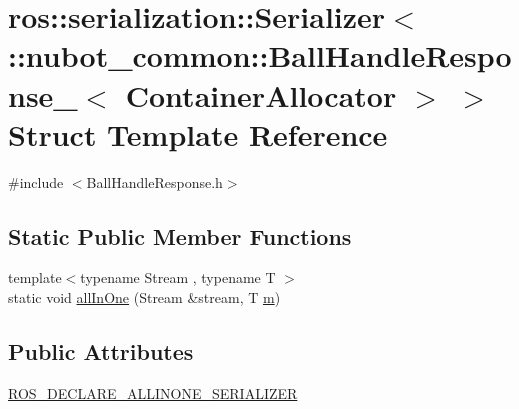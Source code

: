 \hypertarget{structros_1_1serialization_1_1Serializer_3_01_1_1nubot__common_1_1BallHandleResponse___3_01ContainerAllocator_01_4_01_4}{\section{ros\-:\-:serialization\-:\-:Serializer$<$ \-:\-:nubot\-\_\-common\-:\-:Ball\-Handle\-Response\-\_\-$<$ Container\-Allocator $>$ $>$ Struct Template Reference}
\label{structros_1_1serialization_1_1Serializer_3_01_1_1nubot__common_1_1BallHandleResponse___3_01ContainerAllocator_01_4_01_4}
}


{\ttfamily \#include $<$Ball\-Handle\-Response.\-h$>$}

\subsection*{Static Public Member Functions}
\begin{DoxyCompactItemize}
\item 
{\footnotesize template$<$typename Stream , typename T $>$ }\\static void \hyperlink{structros_1_1serialization_1_1Serializer_3_01_1_1nubot__common_1_1BallHandleResponse___3_01ContainerAllocator_01_4_01_4_aa60fb4966f9d50711ea95a4c8ec41b95}{all\-In\-One} (Stream \&stream, T \hyperlink{nubot__gazebo_8cc_a9990e99e87d163c58817550b21d35a83}{m})
\end{DoxyCompactItemize}
\subsection*{Public Attributes}
\begin{DoxyCompactItemize}
\item 
\hyperlink{structros_1_1serialization_1_1Serializer_3_01_1_1nubot__common_1_1BallHandleResponse___3_01ContainerAllocator_01_4_01_4_aa5d0d70188f3cf37d0f0b5bb9422dc47}{R\-O\-S\-\_\-\-D\-E\-C\-L\-A\-R\-E\-\_\-\-A\-L\-L\-I\-N\-O\-N\-E\-\_\-\-S\-E\-R\-I\-A\-L\-I\-Z\-E\-R}
\end{DoxyCompactItemize}


